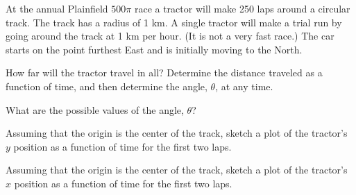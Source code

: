 \begin{problem}
\begin{subproblem}
  \end{subproblem}

  \clearpage

\item At the annual Plainfield $500\pi$ race a tractor will make 250 laps
  around a circular track. The track has a radius of 1 km. A single
  tractor will make a trial run by going around the track at 1 km per
  hour. (It is not a very fast race.) The car starts on the point
  furthest East and is initially moving to the North.



  \begin{subproblem}
  \item How far will the tractor travel in all? Determine the distance
    traveled as a function of time, and then determine the angle,
    $\theta$, at any time.
    \vfill
  \item What are the possible values of the angle, $\theta$?
    \vspace{1em}
  \item Assuming that the origin is the center of the track, sketch a
    plot of the tractor's $y$ position as a function of time for the
    first two laps.
    \vfill
  \item Assuming that the origin is the center of the track, sketch a
    plot of the tractor's $x$ position as a function of time for the
    first two laps.
    \vfill
  \end{subproblem}
\end{problem}

\postClass

